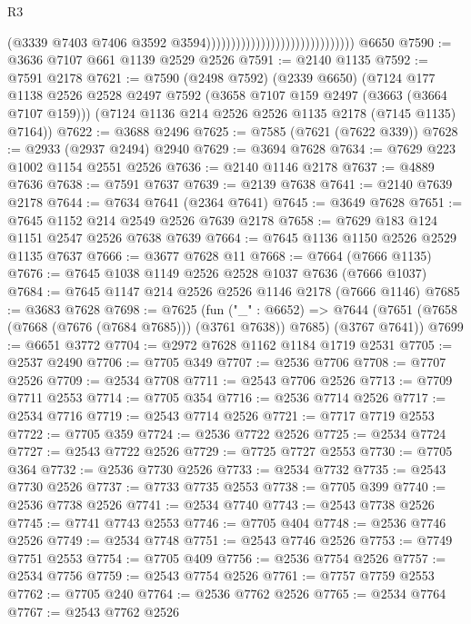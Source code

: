 \begin{lexlean}{R3}
\begin{coremodule}
                                                              (@3339
                                                                @7403
                                                                @7406
                                                                @3592
                                                                @3594))))))))))))))))))))))))))))))
    @6650
@7590 := @3636 @7107 @661 @1139 @2529 @2526
@7591 := @2140 @1135
@7592 := @7591 @2178
@7621 := @7590
    (@2498 @7592)
    (@2339 @6650)
    (@7124
      @177
      @1138
      @2526
      @2528
      @2497
      @7592
      (@3658 @7107 @159 @2497 (@3663 (@3664 @7107 @159)))
      (@7124 @1136 @214 @2526 @2526 @1135 @2178 (@7145 @1135) @7164))
@7622 := @3688 @2496
@7625 := @7585 (@7621 (@7622 @339))
@7628 := @2933 (@2937 @2494) @2940
@7629 := @3694 @7628
@7634 := @7629 @223 @1002 @1154 @2551 @2526
@7636 := @2140 @1146 @2178
@7637 := @4889 @7636
@7638 := @7591 @7637
@7639 := @2139 @7638
@7641 := @2140 @7639 @2178
@7644 := @7634 @7641 (@2364 @7641)
@7645 := @3649 @7628
@7651 := @7645 @1152 @214 @2549 @2526 @7639 @2178
@7658 := @7629 @183 @124 @1151 @2547 @2526 @7638 @7639
@7664 := @7645 @1136 @1150 @2526 @2529 @1135 @7637
@7666 := @3677 @7628 @11
@7668 := @7664 (@7666 @1135)
@7676 := @7645 @1038 @1149 @2526 @2528 @1037 @7636 (@7666 @1037)
@7684 := @7645 @1147 @214 @2526 @2526 @1146 @2178 (@7666 @1146)
@7685 := @3683 @7628
@7698 := @7625
    (fun ("_" : @6652) =>
    @7644 (@7651 (@7658 (@7668 (@7676 (@7684 @7685))) (@3761 @7638)) @7685) (@3767 @7641))
@7699 := @6651 @3772
@7704 := @2972 @7628 @1162 @1184 @1719 @2531
@7705 := @2537 @2490
@7706 := @7705 @349
@7707 := @2536 @7706
@7708 := @7707 @2526
@7709 := @2534 @7708
@7711 := @2543 @7706 @2526
@7713 := @7709 @7711 @2553
@7714 := @7705 @354
@7716 := @2536 @7714 @2526
@7717 := @2534 @7716
@7719 := @2543 @7714 @2526
@7721 := @7717 @7719 @2553
@7722 := @7705 @359
@7724 := @2536 @7722 @2526
@7725 := @2534 @7724
@7727 := @2543 @7722 @2526
@7729 := @7725 @7727 @2553
@7730 := @7705 @364
@7732 := @2536 @7730 @2526
@7733 := @2534 @7732
@7735 := @2543 @7730 @2526
@7737 := @7733 @7735 @2553
@7738 := @7705 @399
@7740 := @2536 @7738 @2526
@7741 := @2534 @7740
@7743 := @2543 @7738 @2526
@7745 := @7741 @7743 @2553
@7746 := @7705 @404
@7748 := @2536 @7746 @2526
@7749 := @2534 @7748
@7751 := @2543 @7746 @2526
@7753 := @7749 @7751 @2553
@7754 := @7705 @409
@7756 := @2536 @7754 @2526
@7757 := @2534 @7756
@7759 := @2543 @7754 @2526
@7761 := @7757 @7759 @2553
@7762 := @7705 @240
@7764 := @2536 @7762 @2526
@7765 := @2534 @7764
@7767 := @2543 @7762 @2526

\end{coremodule}
\end{lexlean}
